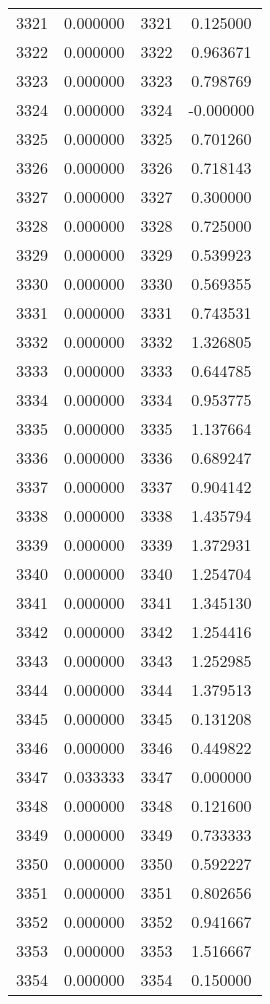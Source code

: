 \documentclass[12pt]{article}
\begin{document}
\begin{longtable}{@{}cccc@{}}
3321 & 0.000000 & 3321 & 0.125000 \\
3322 & 0.000000 & 3322 & 0.963671 \\
3323 & 0.000000 & 3323 & 0.798769 \\
3324 & 0.000000 & 3324 & -0.000000 \\
3325 & 0.000000 & 3325 & 0.701260 \\
3326 & 0.000000 & 3326 & 0.718143 \\
3327 & 0.000000 & 3327 & 0.300000 \\
3328 & 0.000000 & 3328 & 0.725000 \\
3329 & 0.000000 & 3329 & 0.539923 \\
3330 & 0.000000 & 3330 & 0.569355 \\
3331 & 0.000000 & 3331 & 0.743531 \\
3332 & 0.000000 & 3332 & 1.326805 \\
3333 & 0.000000 & 3333 & 0.644785 \\
3334 & 0.000000 & 3334 & 0.953775 \\
3335 & 0.000000 & 3335 & 1.137664 \\
3336 & 0.000000 & 3336 & 0.689247 \\
3337 & 0.000000 & 3337 & 0.904142 \\
3338 & 0.000000 & 3338 & 1.435794 \\
3339 & 0.000000 & 3339 & 1.372931 \\
3340 & 0.000000 & 3340 & 1.254704 \\
3341 & 0.000000 & 3341 & 1.345130 \\
3342 & 0.000000 & 3342 & 1.254416 \\
3343 & 0.000000 & 3343 & 1.252985 \\
3344 & 0.000000 & 3344 & 1.379513 \\
3345 & 0.000000 & 3345 & 0.131208 \\
3346 & 0.000000 & 3346 & 0.449822 \\
3347 & 0.033333 & 3347 & 0.000000 \\
3348 & 0.000000 & 3348 & 0.121600 \\
3349 & 0.000000 & 3349 & 0.733333 \\
3350 & 0.000000 & 3350 & 0.592227 \\
3351 & 0.000000 & 3351 & 0.802656 \\
3352 & 0.000000 & 3352 & 0.941667 \\
3353 & 0.000000 & 3353 & 1.516667 \\
3354 & 0.000000 & 3354 & 0.150000 \\

\end{longtable}
\end{document}
